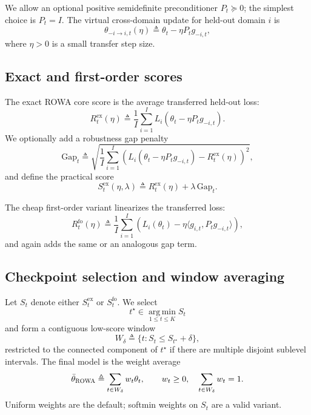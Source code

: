 \documentclass{article}
\newcommand{\argmin}{\operatorname*{arg\,min}}
\newcommand{\rowa}{\textup{\textsc{ROWA}}}
\begin{document}
We allow an optional positive semidefinite preconditioner $P_t \succeq 0$; the simplest choice is $P_t = I$. The virtual cross-domain update for held-out domain $i$ is
\begin{equation}
    \theta_{-i \rightarrow i,t}(\eta) \triangleq \theta_t - \eta P_t g_{-i,t},
\end{equation}
where $\eta > 0$ is a small transfer step size.

\subsection{Exact and first-order scores}

The exact \rowa{} core score is the average transferred held-out loss:
\begin{equation}
    R_t^{\mathrm{ex}}(\eta) \triangleq \frac{1}{I}\sum_{i=1}^{I}
    L_i\!\left(\theta_t - \eta P_t g_{-i,t}\right).
    \label{eq:exact_score}
\end{equation}
We optionally add a robustness gap penalty
\begin{equation}
    \mathrm{Gap}_t \triangleq \sqrt{\frac{1}{I}\sum_{i=1}^{I}\left(
    L_i\!\left(\theta_t - \eta P_t g_{-i,t}\right) - R_t^{\mathrm{ex}}(\eta)
    \right)^2},
\end{equation}
and define the practical score
\begin{equation}
    S_t^{\mathrm{ex}}(\eta,\lambda) \triangleq R_t^{\mathrm{ex}}(\eta) + \lambda\, \mathrm{Gap}_t.
\end{equation}

The cheap first-order variant linearizes the transferred loss:
\begin{equation}
    R_t^{\mathrm{fo}}(\eta) \triangleq
    \frac{1}{I}\sum_{i=1}^{I} \left(
        L_i(\theta_t) - \eta \langle g_{i,t}, P_t g_{-i,t}\rangle
    \right),
    \label{eq:first_order_score}
\end{equation}
and again adds the same or an analogous gap term.

\subsection{Checkpoint selection and window averaging}

Let $S_t$ denote either $S_t^{\mathrm{ex}}$ or $S_t^{\mathrm{fo}}$. We select
\begin{equation}
    t^\star \in \argmin_{1 \le t \le K} S_t
\end{equation}
and form a contiguous low-score window
\begin{equation}
    W_\delta \triangleq \{t: S_t \le S_{t^\star} + \delta\},
\end{equation}
restricted to the connected component of $t^\star$ if there are multiple disjoint sublevel intervals. The final model is the weight average
\begin{equation}
    \bar \theta_{\rowa} \triangleq \sum_{t \in W_\delta} w_t \theta_t,
    \qquad
    w_t \ge 0,\quad \sum_{t \in W_\delta} w_t = 1.
\end{equation}
Uniform weights are the default; softmin weights on $S_t$ are a valid variant.
\end{document}
